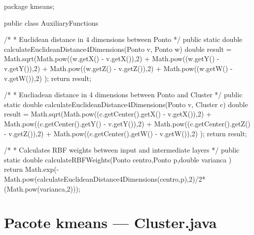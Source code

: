 \documentclass[10pt,twocolumn,letterpaper]{article}
\begin{document}
\begin{spverbatim}
package kmeans;

public class AuxiliaryFunctions {
	
	/*
	 * Euclidean distance in 4 dimensions between Ponto
	 */
	public static double calculateEuclideanDistance4Dimensions(Ponto v, Ponto w){
		double result = Math.sqrt(Math.pow((w.getX() - v.getX()),2) + Math.pow((w.getY() - v.getY()),2) +
						Math.pow((w.getZ() - v.getZ()),2) + Math.pow((w.getW() - v.getW()),2) );
		return result;
	}
	
	/*
	 * Eucliadean distance in 4 dimensions between Ponto and Cluster
	 */
	public static double calculateEuclideanDistance4Dimensions(Ponto v, Cluster c){
		double result = Math.sqrt(Math.pow((c.getCenter().getX() - v.getX()),2) + Math.pow((c.getCenter().getY() - v.getY()),2) +
						Math.pow((c.getCenter().getZ() - v.getZ()),2) + Math.pow((c.getCenter().getW() - v.getW()),2) );
		return result;
	}
	
	/*
	 * Calculates RBF weights between input and intermediate layers
	 */
	public static double calculateRBFWeights(Ponto centro,Ponto p,double varianca ){
		return Math.exp(-Math.pow(calculateEuclideanDistance4Dimensions(centro,p),2)/2* (Math.pow(varianca,2)));
	}
}
\end{spverbatim}

\section*{Pacote kmeans --- Cluster.java}
\end{document}
